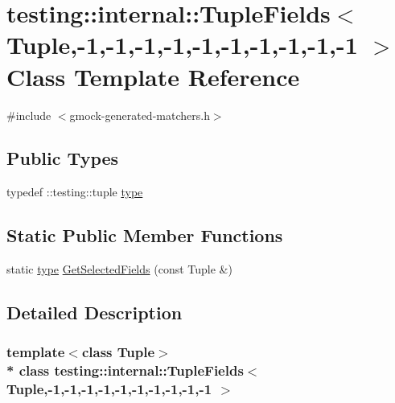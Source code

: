 \hypertarget{classtesting_1_1internal_1_1_tuple_fields_3_01_tuple_00-1_00-1_00-1_00-1_00-1_00-1_00-1_00-1_00-1_00-1_01_4}{}\section{testing\+:\+:internal\+:\+:Tuple\+Fields$<$ Tuple,-\/1,-\/1,-\/1,-\/1,-\/1,-\/1,-\/1,-\/1,-\/1,-\/1 $>$ Class Template Reference}
\label{classtesting_1_1internal_1_1_tuple_fields_3_01_tuple_00-1_00-1_00-1_00-1_00-1_00-1_00-1_00-1_00-1_00-1_01_4}


{\ttfamily \#include $<$gmock-\/generated-\/matchers.\+h$>$}

\subsection*{Public Types}
\begin{DoxyCompactItemize}
\item 
typedef \+::testing\+::tuple \hyperlink{classtesting_1_1internal_1_1_tuple_fields_3_01_tuple_00-1_00-1_00-1_00-1_00-1_00-1_00-1_00-1_00-1_00-1_01_4_addfc4b7d727aa8e4c7838a378a573bf6}{type}
\end{DoxyCompactItemize}
\subsection*{Static Public Member Functions}
\begin{DoxyCompactItemize}
\item 
static \hyperlink{classtesting_1_1internal_1_1_tuple_fields_3_01_tuple_00-1_00-1_00-1_00-1_00-1_00-1_00-1_00-1_00-1_00-1_01_4_addfc4b7d727aa8e4c7838a378a573bf6}{type} \hyperlink{classtesting_1_1internal_1_1_tuple_fields_3_01_tuple_00-1_00-1_00-1_00-1_00-1_00-1_00-1_00-1_00-1_00-1_01_4_a903907f35d09b8b0f4e4e2778c1350f7}{Get\+Selected\+Fields} (const Tuple \&)
\end{DoxyCompactItemize}


\subsection{Detailed Description}
\subsubsection*{template$<$class Tuple$>$\\*
class testing\+::internal\+::\+Tuple\+Fields$<$ Tuple,-\/1,-\/1,-\/1,-\/1,-\/1,-\/1,-\/1,-\/1,-\/1,-\/1 $>$}




